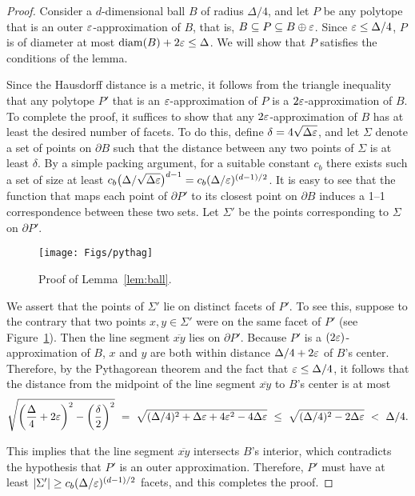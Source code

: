 \documentclass[11pt]{article}   \usepackage[letterpaper,hmargin=2.1cm,vmargin=3cm]{geometry}
\newcommand{\diam}{\mathrm{diam}}
\begin{document}
{\BallLemmaStmt*}


\begin{proof}
Consider a $d$-dimensional ball $B$ of radius $\Delta/4$, and let $P$ be any polytope that is an outer $\varepsilon$-approximation of $B$, that is, $B \subseteq P \subseteq B \oplus \varepsilon$. Since $\varepsilon \le \Delta/4$, $P$ is of diameter at most $\diam(B) + 2 \eps \le \Delta$. We will show that $P$ satisfies the conditions of the lemma.

Since the Hausdorff distance is a metric, it follows from the triangle inequality that any polytope $P'$ that is an $\varepsilon$-approximation of $P$ is a $2 \varepsilon$-approximation of $B$. To complete the proof, it suffices to show that any $2 \varepsilon$-approximation of $B$ has at least the desired number of facets. To do this, define $\delta = 4\sqrt{\Delta \varepsilon}$, and let $\Sigma$ denote a set of points on $\partial B$ such that the distance between any two points of $\Sigma$ is at least $\delta$. By a simple packing argument, for a suitable constant $c_b$ there exists such a set of size at least $c_b \big(\Delta / \sqrt{\Delta \varepsilon} \big)^{d-1} = c_b (\Delta / \varepsilon)^{(d-1)/2}$. It is easy to see that the function that maps each point of $\partial P'$ to its closest point on $\partial B$ induces a 1--1 correspondence between these two sets. Let $\Sigma'$ be the points corresponding to $\Sigma$ on $\partial P'$.

\begin{figure}[htbp]
	\centerline{\texttt{[image: Figs/pythag]}}
	\caption{Proof of Lemma~\ref{lem:ball}.}
	\label{fig:pythag}
\end{figure}


We assert that the points of $\Sigma'$ lie on distinct facets of $P'$. To see this, suppose to the contrary that two points $x,y \in \Sigma'$ were on the same facet of $P'$ (see Figure~\ref{fig:pythag}). Then the line segment $\overline{x y}$ lies on $\partial P'$. Because $P'$ is a $(2\varepsilon)$-approximation of $B$, $x$ and $y$ are both within distance $\Delta/4 + 2\varepsilon$ of $B$'s center. Therefore, by the Pythagorean theorem and the fact that $\varepsilon \le \Delta/4$, it follows that the distance from the midpoint of the line segment $\overline{x y}$ to $B$'s center is at most
\[
	\sqrt{\left(\frac{\Delta}{4} + 2\varepsilon\right)^2 - \left(\frac{\delta}{2}\right)^2}
		~  =  ~ \sqrt{(\Delta/4)^2 + \Delta \varepsilon + 4 \varepsilon^2 - 4 \Delta \varepsilon}
		~ \le ~ \sqrt{(\Delta/4)^2 - 2 \Delta \varepsilon}
		~  <  ~ \Delta/4.
\]

This implies that the line segment $\overline{x y}$ intersects $B$'s interior, which contradicts the hypothesis that $P'$ is an outer approximation. Therefore, $P'$ must have at least $|\Sigma'| \ge c_b (\Delta / \varepsilon)^{(d-1)/2}$ facets, and this completes the proof.
\end{proof} 
\end{document}
